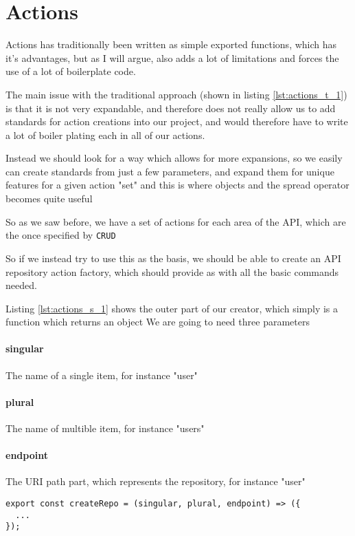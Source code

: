 \section{Actions}
Actions has traditionally been written as simple exported functions, which has it's advantages, but as I will argue, also adds a lot of limitations and forces the use of a lot of boilerplate code.

The main issue with the traditional approach (shown in listing \ref{lst:actions_t_1}) is that it is not very expandable, and therefore does not really allow us to add standards for action creations into our project, and would therefore have to write a lot of boiler plating each in all of our actions.



Instead we should look for a way which allows for more expansions, so we easily can create standards from just a few parameters, and expand them for unique features for a given action "set" and this is where objects and the spread operator becomes quite useful

So as we saw before, we have a set of actions for each area of the API, which are the once specified by \lstinline{CRUD}

So if we instead try to use this as the basis, we should be able to create an API repository action factory, which should provide as with all the basic commands needed.

Listing \ref{lst:actions_s_1} shows the outer part of our creator, which simply is a function which returns an object
We are going to need three parameters

\paragraph{singular} The name of a single item, for instance "user"
\paragraph{plural} The name of multible item, for instance "users"
\paragraph{endpoint} The URI path part, which represents the repository, for instance "user"

\begin{lstlisting}[label=lst:actions_s_1, caption=The wrapper for the repository factory]
export const createRepo = (singular, plural, endpoint) => ({
  ...
});
\end{lstlisting}

